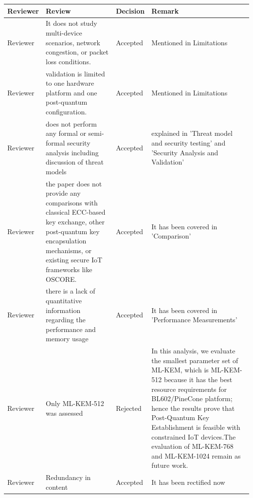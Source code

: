 \documentclass[a4paper]{scrartcl}
\begin{document}
 \begin{table}[H]
\centering
\begin{tabular}{|p{2cm}|p{5cm}|p{2cm}|p{5cm}|}
\hline
\textbf{Reviewer} & \textbf{Review} & \textbf{Decision} & \textbf{Remark} \\
\hline

Reviewer &
It does not study multi-device scenarios, network congestion, or packet loss conditions. &
Accepted &
Mentioned in Limitations\\
\hline

Reviewer &
validation is limited to one hardware platform and one post-quantum configuration. &
Accepted &
Mentioned in Limitations\\
\hline

Reviewer &
 does not perform any formal or semi-formal security analysis including discussion of threat models&
Accepted &
explained in 'Threat model and security testing' and 'Security Analysis and Validation' \\
\hline

Reviewer &
 the paper does not provide any comparisons with classical
ECC-based key exchange, other post-quantum key encapsulation
mechanisms, or existing secure IoT frameworks like OSCORE.&
Accepted &
It has been covered in 'Comparison'\\
\hline

Reviewer &
there is a lack of quantitative information regarding the performance and memory usage&
Accepted &
It has been covered in 'Performance Measurements'\\
\hline

Reviewer &
Only ML-KEM-512 was assessed &
Rejected &
In this analysis, we evaluate the smallest parameter set of ML-KEM, which is ML-KEM-512 because it has the best resource requirements for BL602/PineCone platform; hence the results prove that Post-Quantum Key Establishment is feasible with constrained IoT devices.The evaluation of ML-KEM-768 and ML-KEM-1024 remain as future work.\\
\hline

Reviewer &
Redundancy in content&
Accepted &
It has been rectified now\\
\hline




\end{tabular}
\label{tab:review}
\end{table}
\end{document}

